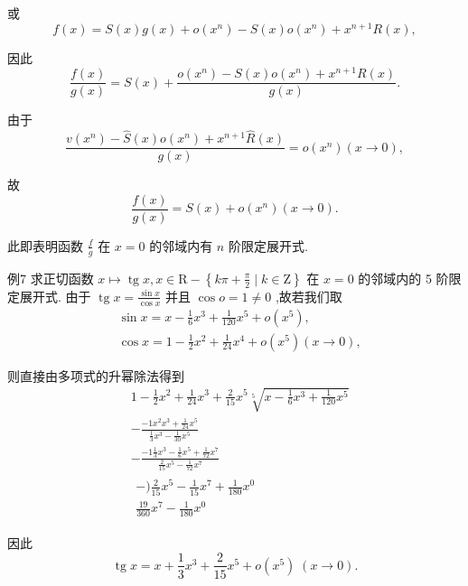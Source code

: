 或
$$f\left( x\right)  = S\left( x\right) g\left( x\right)  + o\left( {x}^{n}\right)  - S\left( x\right) o\left( {x}^{n}\right)  + {x}^{n + 1}R\left( x\right) ,$$

因此
$$\frac{f\left( x\right) }{g\left( x\right) } = S\left( x\right)  + \frac{o\left( {x}^{n}\right)  - S\left( x\right) o\left( {x}^{n}\right)  + {x}^{n + 1}R\left( x\right) }{g\left( x\right) }.$$

由于
$$\frac{v\left( {x}^{n}\right)  - \widehat{S}\left( x\right) o\left( {x}^{n}\right)  + {x}^{n + 1}\widehat{R}\left( x\right) }{g\left( x\right) } = o\left( {x}^{n}\right) \left( {x \rightarrow  0}\right) ,$$

故
$$\frac{f\left( x\right) }{g\left( x\right) } = S\left( x\right)  + o\left( {x}^{n}\right) \left( {x \rightarrow  0}\right) .$$

此即表明函数 $\frac{f}{g}$ 在 $x = 0$ 的邻域内有 $n$ 阶限定展开式.

例7 求正切函数 $x \mapsto  \operatorname{tg}x,x \in  \mathrm{R} - \left\{  {{k\pi } + \frac{\pi }{2} \mid  k \in  \mathrm{Z}}\right\}$ 在 $x = 0$ 的邻域内的 5 阶限定展开式. 由于 $\operatorname{tg}x = \frac{\sin x}{\cos x}$ 并且 $\cos o = 1 \neq  0$ ,故若我们取
\begin{align*}
	&\sin x = x - \frac{1}{6}{x}^{3} + \frac{1}{120}{x}^{5} + o\left( {x}^{5}\right) ,\\
	&\cos x = 1 - \frac{1}{2}{x}^{2} + \frac{1}{24}{x}^{4} + o\left( {x}^{5}\right) \left( {x \rightarrow  0}\right) ,
\end{align*}

则直接由多项式的升幂除法得到
\begin{align*}
	&1 - \frac{1}{2}{x}^{2} + \frac{1}{24}{x}^{3} + \frac{2}{15}{x}^{5}\sqrt[5]{x - \frac{1}{6}{x}^{3} + \frac{1}{120}{x}^{5}}\\
	&- \frac{-1{x}^{2}{x}^{3} + \frac{1}{24}{x}^{5}}{\frac{1}{3}{x}^{3} - \frac{1}{30}{x}^{5}}\\
	&- \frac{-1\frac{1}{3}{x}^{3} - \frac{1}{6}{x}^{5} + \frac{1}{72}{x}^{7}}{\frac{2}{15}{x}^{5} - \frac{1}{72}{x}^{7}}\\
	&\begin{array}{r}  - )\frac{2}{15}{x}^{5} - \frac{1}{15}{x}^{7} + \frac{1}{180}{x}^{0} \\  \frac{19}{360}{x}^{7} - \frac{1}{180}{x}^{0} \end{array}
\end{align*}

因此
$$\operatorname{tg}x = x + \frac{1}{3}{x}^{3} + \frac{2}{15}{x}^{5} + o\left( {x}^{5}\right) \;\left( {x \rightarrow  0}\right) .$$

